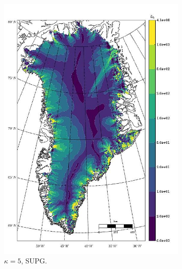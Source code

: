 \begin{figure}
\begin{subfigure}[b]{0.25\linewidth}
    \includegraphics[width=\linewidth]{images/balance_velocity/greenland/Ubar_5H_kappa_5_SUPG.jpg}
  \caption{$\kappa = 5$, SUPG.}
  \label{greenland_bv_image_kappa_5_SUPG}
  \end{subfigure}
  \begin{subfigure}[b]{0.25\linewidth}

\end{subfigure}
\end{figure}
